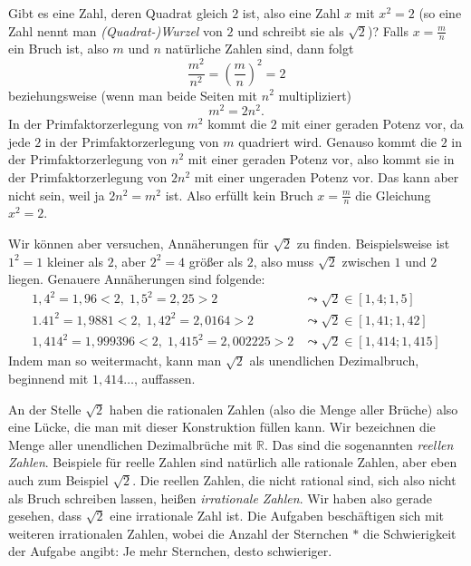 \documentclass{zusammenfassung}
\begin{document}

Gibt es eine Zahl, deren Quadrat gleich $2$ ist, also eine Zahl $x$ mit $x^2=2$ (so eine Zahl nennt man \emph{(Quadrat-)Wurzel} von
$2$ und schreibt sie als $\sqrt 2$)? Falls $x=\frac mn$ ein Bruch ist, also $m$ und $n$ natürliche Zahlen sind, dann folgt
\[
	\frac{m^2}{n^2}=\left(\frac mn\right)^2=2
\]
beziehungsweise (wenn man beide Seiten mit $n^2$ multipliziert)
\[
	m^2=2n^2.
\]
In der Primfaktorzerlegung von $m^2$ kommt die $2$ mit einer geraden Potenz vor, da jede $2$ in der Primfaktorzerlegung von $m$
quadriert wird. Genauso kommt die $2$ in der Primfaktorzerlegung von $n^2$ mit einer geraden Potenz vor, also kommt sie in der
Primfaktorzerlegung von $2n^2$ mit einer ungeraden Potenz vor. Das kann aber nicht sein, weil ja $2n^2=m^2$ ist. Also erfüllt kein
Bruch $x=\frac mn$ die Gleichung $x^2=2$.

Wir können aber versuchen, Annäherungen für $\sqrt 2$ zu finden. Beispielsweise ist $1^2=1$ kleiner als $2$, aber $2^2=4$ größer
als $2$, also muss $\sqrt 2$ zwischen $1$ und $2$ liegen. Genauere Annäherungen sind folgende:
\begin{align*}
	1,4^2=1,96<2,\; 1,5^2=2,25>2&\leadsto \sqrt 2\in[1,4;1,5]\\
	1.41^2=1,9881<2,\;1,42^2=2,0164>2&\leadsto \sqrt 2\in[1,41;1,42]\\
	1,414^2=1,999396<2,\;1,415^2=2,002225>2&\leadsto \sqrt 2\in[1,414;1,415]
\end{align*}
Indem man so weitermacht, kann man $\sqrt 2$ als unendlichen Dezimalbruch, beginnend mit $1,414\ldots$, auffassen.

An der Stelle $\sqrt 2$ haben die rationalen Zahlen (also die Menge aller Brüche) also eine Lücke, die man mit dieser Konstruktion
füllen kann. Wir bezeichnen die Menge aller unendlichen Dezimalbrüche mit $\mathbb R$. Das sind die sogenannten \emph{reellen
Zahlen}. Beispiele für reelle Zahlen sind natürlich alle rationale Zahlen, aber eben auch zum Beispiel $\sqrt 2$. Die reellen
Zahlen, die nicht rational sind, sich also nicht als Bruch schreiben lassen, heißen \emph{irrationale Zahlen}. Wir haben also
gerade gesehen, dass $\sqrt 2$ eine irrationale Zahl ist. Die Aufgaben beschäftigen sich mit weiteren irrationalen Zahlen, wobei
die Anzahl der Sternchen $*$ die Schwierigkeit der Aufgabe angibt: Je mehr Sternchen, desto schwieriger.
\end{document}
